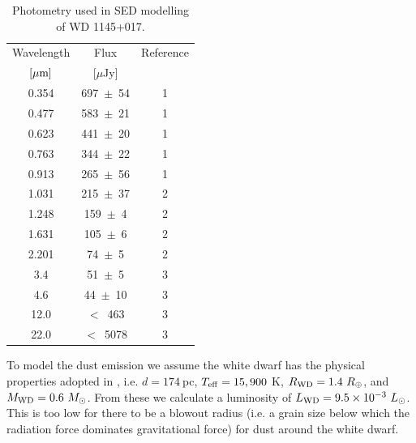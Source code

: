 \documentclass[iop,useAMES,usenatbig]{emulateapj}
\begin{document}
\begin{table}[]
    \centering
    \caption{Photometry used in SED modelling of WD 1145+017. \label{tab:wd1145p017_phot}}
    \begin{tabular}{ccc}
        \hline\hline
        Wavelength & Flux  & Reference \\
        $[\mu \rm m]$ & [$\mu$Jy] & \\ 
        \hline
        \phantom{0}0.354 & 697~$\pm$~54 & 1\\
        \phantom{0}0.477 & 583~$\pm$~21 & 1\\
        \phantom{0}0.623 & 441~$\pm$~20 & 1\\
        \phantom{0}0.763 & 344~$\pm$~22 & 1\\
        \phantom{0}0.913 & 265~$\pm$~56 & 1\\
        \phantom{0}1.031 & 215~$\pm$~37 & 2\\
        \phantom{0}1.248 & 159~$\pm$~\phantom{0}4 & 2\\
        \phantom{0}1.631 & 105~$\pm$~\phantom{0}6 & 2\\
        \phantom{0}2.201 & \phantom{0}74~$\pm$~\phantom{0}5 & 2\\
        \phantom{0}3.4\phantom{00} & \phantom{0}51~$\pm$~\phantom{0}5 & 3\\
        \phantom{0}4.6\phantom{00} & \phantom{0}44~$\pm$~10 & 3\\
        12.0\phantom{00} & $<$~\phantom{0}463 & 3\\
        22.0\phantom{00} & $<$~5078 & 3\\
        \hline
    \end{tabular}
\end{table}

To model the dust emission we assume the white dwarf has the physical properties adopted in \cite{2015Natur.526..546V}, i.e. $d = 174~$pc, $T_{\rm eff} = 15,900~$K, $R_{\rm WD} = 1.4~R_{\oplus}$, and $M_{\rm WD} = 0.6~M_{\odot}$. From these we calculate a luminosity of $L_{\rm WD} = 9.5\times10^{-3}~L_{\odot}$. This is too low for there to be a blowout radius (i.e. a grain size below which the radiation force dominates gravitational force) for dust around the white dwarf. 
\end{document}
